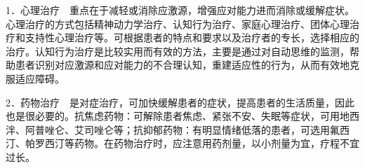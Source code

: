 1．心理治疗　重点在于减轻或消除应激源，增强应对能力进而消除或缓解症状。心理治疗的方式包括精神动力学治疗、认知行为治疗、家庭心理治疗、团体心理治疗和支持性心理治疗等。可根据患者的特点和要求以及治疗者的专长，选择相应的治疗。认知行为治疗是比较实用而有效的方法，主要是通过对自动思维的监测，帮助患者识别对应激源和应对能力的不合理认知，重建适应性的行为，从而有效地克服适应障碍。

2．药物治疗　是对症治疗，可加快缓解患者的症状，提高患者的生活质量，因此也是很必要的。抗焦虑药物：可解除患者焦虑、紧张不安、失眠等症状，可用地西泮、阿普唑仑、艾司唑仑等；抗抑郁药物：有明显情绪低落的患者，可选用氟西汀、帕罗西汀等药物。在药物治疗时，应注意用药剂量，以小剂量为宜，疗程不宜过长。



